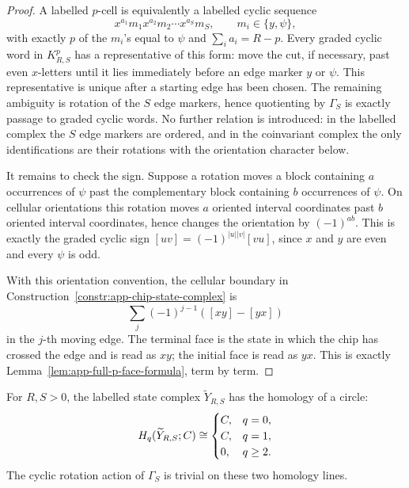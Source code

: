 \begin{proof}
  A labelled \(p\)-cell is equivalently a labelled cyclic sequence
  \[
    x^{a_1}m_1x^{a_2}m_2\cdots x^{a_S}m_S,\qquad
    m_i\in\{y,\psi\},
  \]
  with exactly \(p\) of the \(m_i\)'s equal to \(\psi\) and
  \(\sum_i a_i=R-p\).  Every graded cyclic word in
  \(K^p_{R,S}\) has a representative of this form: move the cut, if
  necessary, past even \(x\)-letters until it lies immediately before an edge
  marker \(y\) or \(\psi\).  This representative is unique after a starting
  edge has been chosen.  The remaining ambiguity is rotation of the \(S\) edge
  markers, hence quotienting by \(\Gamma_S\) is exactly passage to graded
  cyclic words.  No further relation is introduced: in the labelled complex
  the \(S\) edge markers are ordered, and in the coinvariant complex the only
  identifications are their rotations with the orientation character below.

  It remains to check the sign.  Suppose a rotation moves a block containing
  \(a\) occurrences of
  \(\psi\) past the complementary block containing \(b\) occurrences of
  \(\psi\).  On cellular orientations this rotation moves \(a\) oriented
  interval coordinates past \(b\) oriented interval coordinates, hence changes
  the orientation by \((-1)^{ab}\).  This is exactly the graded cyclic sign
  \([uv]=(-1)^{|u||v|}[vu]\), since \(x\) and \(y\) are even and every
  \(\psi\) is odd.

  With this orientation convention, the cellular boundary in
  Construction~\ref{constr:app-chip-state-complex} is
  \[
    \sum_j(-1)^{j-1}([xy]-[yx])
  \]
  in the \(j\)-th moving edge.  The terminal face is the state in which the
  chip has crossed the edge and is read as \(xy\); the initial face is read as
  \(yx\).  This is exactly Lemma~\ref{lem:app-full-p-face-formula}, term by
  term.
\end{proof}

\begin{lem}
\label{lem:app-abel-map-state-homology}
  For \(R,S>0\), the labelled state complex \(\widetilde Y_{R,S}\) has the
  homology of a circle:
  \[
    H_q(\widetilde Y_{R,S};C)\cong
    \begin{cases}
      C,&q=0,\\
      C,&q=1,\\
      0,&q\geq2.
    \end{cases}
  \]
  The cyclic rotation action of \(\Gamma_S\) is trivial on these two homology
  lines.
\end{lem}

